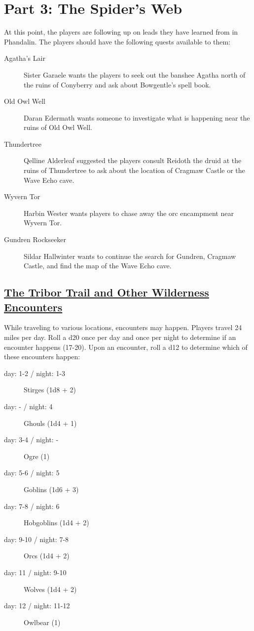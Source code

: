 \section{Part 3: The Spider's Web}
At this point, the players are following up on leads they have learned from in Phandalin. The players should have the following quests available to them:

\begin{description}
	\item[Agatha's Lair] Sister Garaele wants the players to seek out the banshee Agatha north of the ruins of Conyberry and ask about Bowgentle's spell book.
	\item[Old Owl Well] Daran Edermath wants someone to investigate what is happening near the ruins of Old Owl Well.
	\item[Thundertree] Qelline Alderleaf suggested the players consult Reidoth the druid at the ruins of Thundertree to ask about the location of Cragmaw Castle or the Wave Echo cave.
	\item[Wyvern Tor] Harbin Wester wants players to chase away the orc encampment near Wyvern Tor.
	\item[Gundren Rockseeker] Sildar Hallwinter wants to continue the search for Gundren, Cragmaw Castle, and find the map of the Wave Echo cave.
\end{description}

\subsection{\underline{The Tribor Trail and Other Wilderness Encounters}}
While traveling to various locations, encounters may happen. Players travel 24 miles per day. Roll a d20 once per day and once per night to determine if an encounter happens (17-20). Upon an encounter, roll a d12 to determine which of these encounters happen:

\begin{description}
	\item[day: 1-2 / night: 1-3] Stirges (1d8 + 2)
	\item[day: - / night: 4] Ghouls (1d4 + 1)
	\item[day: 3-4 / night: -] Ogre (1)
	\item[day: 5-6 / night: 5] Goblins (1d6 + 3)
	\item[day: 7-8 / night: 6] Hobgoblins (1d4 + 2)
	\item[day: 9-10 / night: 7-8] Orcs (1d4 + 2)
	\item[day: 11 / night: 9-10] Wolves (1d4 + 2)
	\item[day: 12 / night: 11-12] Owlbear (1)
	
\end{description} 

